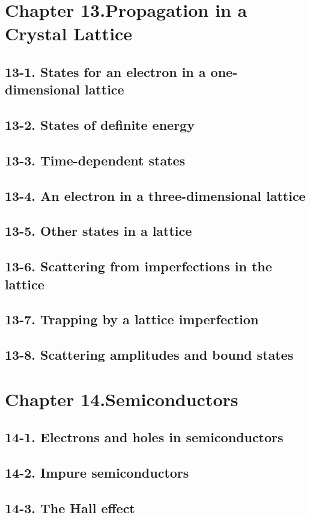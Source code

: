 \documentclass{article}
\begin{document}
\section{Chapter 13.Propagation in a Crystal Lattice}
\subsection{13-1. States for an electron in a one-dimensional lattice}
\subsection{13-2. States of definite energy}
\subsection{13-3. Time-dependent states}
\subsection{13-4. An electron in a three-dimensional lattice}
\subsection{13-5. Other states in a lattice}
\subsection{13-6. Scattering from imperfections in the lattice}
\subsection{13-7. Trapping by a lattice imperfection}
\subsection{13-8. Scattering amplitudes and bound states}
\section{Chapter 14.Semiconductors}
\subsection{14-1. Electrons and holes in semiconductors}
\subsection{14-2. Impure semiconductors}
\subsection{14-3. The Hall effect}
\end{document}
